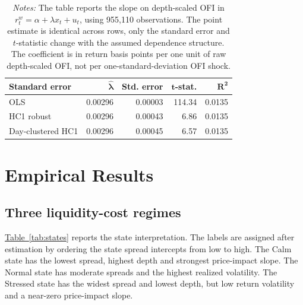 \documentclass[12pt,a4paper]{article}
\newcommand{\tabref}[1]{\hyperref[#1]{Table~\ref*{#1}}}
\begin{document}
\begin{table}[!htbp]
\centering
\caption{Pre-HMM price-impact regression}
\small
\begin{tabular}{lrrrr}
\toprule
\textbf{Standard error} & \(\boldsymbol{\hat{\lambda}}\) & \textbf{Std. error} & \(\boldsymbol{t}\)\textbf{-stat.} & \(\boldsymbol{R^2}\) \\
\midrule
OLS & 0.00296 & 0.00003 & 114.34 & 0.0135 \\
HC1 robust & 0.00296 & 0.00043 & 6.86 & 0.0135 \\
Day-clustered HC1 & 0.00296 & 0.00045 & 6.57 & 0.0135 \\
\bottomrule
\end{tabular}
\caption*{\footnotesize\emph{Notes:} The table reports the slope on depth-scaled OFI in \(r_t^w=\alpha+\lambda x_t+u_t\), using 955,110 observations. The point estimate is identical across rows, only the standard error and \(t\)-statistic change with the assumed dependence structure. The coefficient is in return basis points per one unit of raw depth-scaled OFI, not per one-standard-deviation OFI shock.}
\label{tab:price_impact_pre}
\end{table}

\section{Empirical Results}\label{sec:results}

\subsection{Three liquidity-cost regimes}\label{sec:state_results}

\tabref{tab:states} reports the state interpretation. The labels are assigned after estimation by ordering the state spread intercepts from low to high. The Calm state has the lowest spread, highest depth  and strongest price-impact slope. The Normal state has moderate spreads and the highest realized volatility. The Stressed state has the widest spread and lowest depth, but low return volatility and a near-zero price-impact slope.
\end{document}
